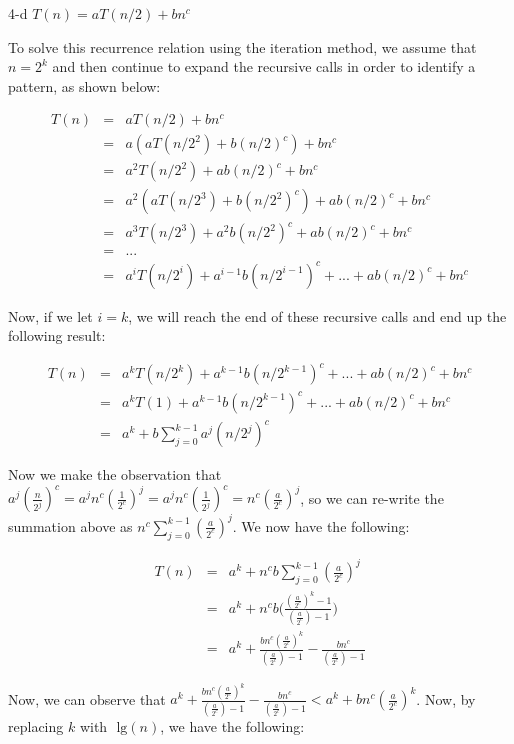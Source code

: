 \documentclass[11pt]{article}
\newcommand{\tlg}{\text{ lg}}
\begin{document}
\begin{prob}{4-d}
$T(n) = aT(n/2) + bn^{c}$
\end{prob}
\begin{sol} 

To solve this recurrence relation using the iteration method, we assume that $n = 2^k$ and then continue to expand the recursive calls in order to identify a pattern, as shown below:

\begin{eqnarray*}
T(n) & = & aT(n/2) + bn^c \\
& = & a(aT(n/2^2) + b(n/2)^c) + bn^c \\
& = & a^2T(n/2^2) + ab(n/2)^c + bn^c\\
& = & a^2(aT(n/2^3) + b(n/2^2)^c) + ab(n/2)^c + bn^c \\
& = & a^3T(n/2^3) + a^2b(n/2^2)^c + ab(n/2)^c + bn^c \\
& = & ... \\
& = & a^iT(n/2^i) + a^{i-1}b(n/2^{i-1})^c + ... + ab(n/2)^c + bn^c
\end{eqnarray*}

Now, if we let $i = k$, we will reach the end of these recursive calls and end up the following result:

\begin{eqnarray*}
T(n) & = & a^{k}T(n/2^k) + a^{k-1}b(n/2^{k-1})^c + ... + ab(n/2)^c + bn^c \\
& = & a^{k}T(1) + a^{k-1}b(n/2^{k-1})^c + ... + ab(n/2)^c + bn^c \\
& = & a^{k} + b\sum_{j=0}^{k-1} a^j(n/2^j)^c
\end{eqnarray*}

Now we make the observation that $a^j(\frac{n}{2^j})^{c} = a^jn^c(\frac{1}{2^c})^j = a^jn^c(\frac{1}{2^j})^c = n^c(\frac{a}{2^c})^j$, so we can re-write the summation above as $n^{c}\sum_{j=0}^{k-1} (\frac{a}{2^c})^{j}$. We now have the following:

\begin{eqnarray*}
T(n) & =&  a^{k} + n^{c}b\sum_{j=0}^{k-1} (\frac{a}{2^c})^j \\
& = & a^{k} + n^{c}b\Bigg(\frac{(\frac{a}{2^c})^k - 1}{(\frac{a}{2^c}) - 1}\Bigg) \\
& = & a^{k} + \frac{bn^c(\frac{a}{2^c})^k}{(\frac{a}{2^c}) - 1} - \frac{bn^c}{(\frac{a}{2^c}) - 1}
\end{eqnarray*}

Now, we can observe that $a^{k} + \frac{bn^c(\frac{a}{2^c})^k}{(\frac{a}{2^c}) - 1} - \frac{bn^c}{(\frac{a}{2^c}) - 1} < a^{k} + bn^c(\frac{a}{2^c})^k$. Now, by replacing $k$ with $\tlg(n)$, we have the following:


\end{sol}
\end{document}
